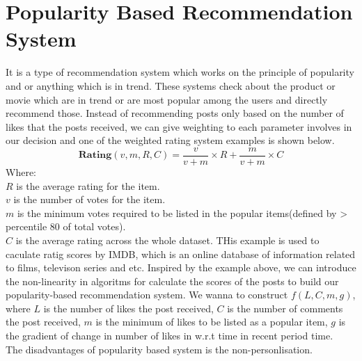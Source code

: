 \section{Popularity Based Recommendation System}
It is a type of recommendation system which works on the principle of popularity and or anything which is in trend. These systems check about the product or movie which are in trend or are most popular among the users and directly recommend those. 
Instead of recommending posts only based on the number of likes that the posts received, we can give weighting to each parameter involves in our decision and one of the weighted rating system examples is shown below.
\begin{equation}
\textbf{Rating}(v,m,R,C) = \frac{v}{v+m} \times R + \frac{m}{v+m} \times C
\end{equation}
Where:
\\$R$ is the average rating for the item.
\\$v$ is the number of votes for the item.
\\$m$ is the minimum votes required to be listed in the popular items(defined by > percentile 80 of total votes).
\\$C$ is the average rating across the whole dataset.
THis example is used to caculate ratig scores by IMDB, which is an online database of information related to films, televison series and etc. 
Inspired by the example above, we can introduce the non-linearity in algoritms for calculate the scores of the posts to build our popularity-based recommendation system.
We wanna to construct $f(L,C,m,g)$, where $L$ is the number of likes the post received, $C$ is the number of comments the post received, 
$m$ is the minimum of likes to be listed as a popular item, $g$ is the gradient of change in number of likes in w.r.t time in recent period time.
\\The disadvantages of popularity based system is the non-personlisation.




